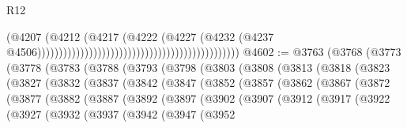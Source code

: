 \begin{lexlean}{R12}
\begin{coremodule}
{{{{{{{{{{{{{{{{{{{{{{{{{{{{{{{{{{{{{{{{{{{{{{{{{{{{{{{{{{{{{{{{{{{{{{{{{{{{{{{{{{                                                                                    (@4207
                                                                                      (@4212
                                                                                        (@4217
                                                                                          (@4222
                                                                                            (@4227
                                                                                              (@4232
                                                                                                (@4237
                                                                                                  @4506)))))))))))))))))))))))))))))))))))))))))))))))
@4602 := @3763
    (@3768
      (@3773
        (@3778
          (@3783
            (@3788
              (@3793
                (@3798
                  (@3803
                    (@3808
                      (@3813
                        (@3818
                          (@3823
                            (@3827
                              (@3832
                                (@3837
                                  (@3842
                                    (@3847
                                      (@3852
                                        (@3857
                                          (@3862
                                            (@3867
                                              (@3872
                                                (@3877
                                                  (@3882
                                                    (@3887
                                                      (@3892
                                                        (@3897
                                                          (@3902
                                                            (@3907
                                                              (@3912
                                                                (@3917
                                                                  (@3922
                                                                    (@3927
                                                                      (@3932
                                                                        (@3937
                                                                          (@3942
                                                                            (@3947
                                                                              (@3952
}}}}}}}}}}}}}}}}}}}}}}}}}}}}}}}}}}}}}}}}}}}}}}}}}}}}}}}}}}}}}}}}}}}}}}}}}}}}}}}}}}
\end{coremodule}
\end{lexlean}
